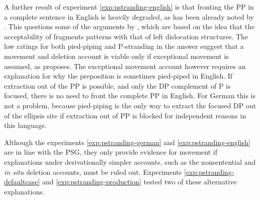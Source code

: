 A further result of experiment \ref{exp:pstranding-english} is that fronting the PP in a complete sentence in English is heavily degraded, as has been already noted by \citet{weir2014a}. This questions some of the arguments by \citet{merchant2004}, which are based on the idea that the acceptability of fragments patterns with that of left dislocation structures. The low ratings for both pied-piping and P-stranding in the answer suggest that a movement and deletion account is viable only if exceptional movement is assumed, as \citet{weir2014} proposes. The exceptional movement account however requires an explanation for why the preposition is sometimes pied-piped in English. If extraction out of the PP is possible, and only the DP complement of P is focused, there is no need to front the complete PP in English. For German this is not a problem, because pied-piping is the only way to extract the focused DP out of the ellipsis site if extraction out of PP is blocked for independent reasons in this language.

Although the experiments \ref{exp:pstranding-german} and \ref{exp:pstranding-english} are in line with the PSG, they only provide evidence for movement if explanations under derivationally simpler accounts, such as the nonsentential and \textit{in situ} deletion accounts, must be ruled out. Experiments \ref{exp:pstranding-defaultcase} and \ref{exp:pstranding-production} tested two of these alternative explanations.

